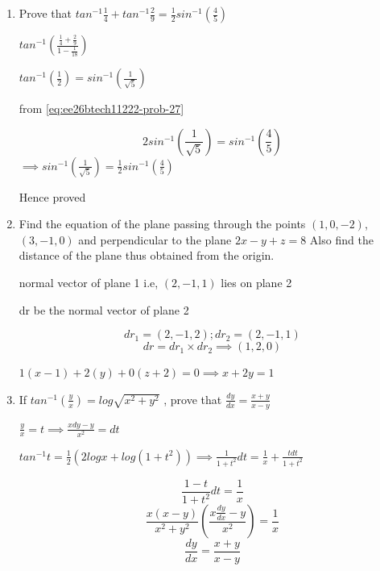 \begin{enumerate}[label=\thesubsection.\arabic*, ref=\thesubsection.\theenumi]
from \eqref{eq:ee26btech11222-prob 21}
\begin{align}
	I= 2\left(\left(\frac{t^2}{2}tan^{-1}t\right)_0^1-\int _0^1 \frac{t^2}{2(t^2+1)}dt\right)
\end{align}
 $I=2\left(\frac{\pi}{8}-\frac{1}{2}\left[t\right]_0^1 +\frac{1}{2}\left[tan^{-1}t\right]_0^1\right) $

$I =\frac{\pi}{2}-1$

\item 

Prove that $tan^{-1}\frac{1}{4}+tan^{-1}\frac{2}{9}=\frac{1}{2}sin^{-1}(\frac{4}{5})$

\solution


$tan^{-1}\left(\frac{\frac{1}{4} +\frac{2}{9}}{1-\frac{1}{18}}\right)$

$tan^{-1}(\frac{1}{2})=sin^{-1}(\frac{1}{\sqrt{5}})$

from \eqref{eq:ee26btech11222-prob-27}

$$2sin^{-1}(\frac{1}{\sqrt{5}})= sin^{-1}(\frac{4}{5})$$ $\implies sin^{-1}(\frac{1}{\sqrt{5}})=\frac{1}{2}sin^{-1}(\frac{4}{5})$

Hence proved 

\item 

Find the equation of the plane passing through the points $(1,0,-2)$, $(3,-1,0)$ and perpendicular to the plane $2x-y+z=8$ Also find the distance of the plane thus obtained from the origin.  

\solution

normal vector of plane 1 i.e, $(2,-1,1)$ lies on plane 2

dr be the normal vector of plane 2

$$dr_1 = (2,-1,2); dr_2= (2,-1,1)$$  $$dr=dr_1 \times {dr_2 } \implies (1,2,0)$$

$1(x-1) +2(y)+0(z+2) =0 \implies x+2y=1$

\item 

If $tan^{-1}(\frac{y}{x})=log\sqrt{x^{2}+y^{2}}$ , prove that $\frac{dy}{dx}=\frac{x+y}{x-y}$

\solution

$\frac{y}{x}=t \implies \frac{xdy-y}{x^2} =dt$

$tan^{-1}t=\frac{1}{2}(2logx +log(1+t^2)) \implies \frac{1}{1+ t^2}dt= \frac{1}{x}+\frac{tdt}{1+t^2}$

$$\frac{1-t}{1+t^2}dt =\frac{1}{x}$$  $$\frac{x(x-y)}{x^2+y^2}\left(\frac{x\frac{dy}{dx}-y}{x^2}\right)=\frac{1}{x}$$ $$\frac{dy}{dx}= \frac{x+y}{x-y}$$


\end{enumerate}
